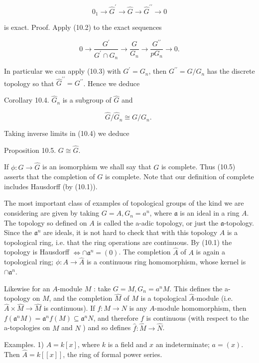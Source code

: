 \documentclass{standalone}
\theoremstyle{definition}
\theoremstyle{remark}
\begin{document}
\[
0_{1} \rightarrow \hat{G}^{\prime} \rightarrow \hat{G} \rightarrow \hat{G}^{\prime \prime} \rightarrow 0
\]

is exact. Proof. Apply (10.2) to the exact sequences

\[
0 \rightarrow \frac{G^{\prime}}{G^{\prime} \cap G_{n}} \rightarrow \frac{G}{G_{n}} \rightarrow \frac{G^{\prime \prime}}{p G_{n}} \rightarrow 0 .
\]

In particular we can apply (10.3) with $G^{\prime}=G_{n}$, then $G^{\prime \prime}=G / G_{n}$ has the discrete topology so that $\hat{G}^{\prime \prime}=G^{\prime \prime}$. Hence we deduce

Corollary 10.4. $\hat{G}_{n}$ is a subgroup of $\hat{G}$ and

\[
\hat{G} / \hat{G}_{n} \cong G / G_{n} \text {. }
\]

Taking inverse limits in (10.4) we deduce

Proposition 10.5. $G \cong \hat{G}$.

If $\phi: G \rightarrow \hat{G}$ is an isomorphism we shall say that $G$ is complete. Thus (10.5) asserts that the completion of $G$ is complete. Note that our definition of complete includes Hausdorff (by (10.1)).

The most important class of examples of topological groups of the kind we are considering are given by taking $G=A, G_{n}=a^{n}$, where $\mathfrak{a}$ is an ideal in a ring $A$. The topology so defined on $A$ is called the a-adic topology, or just the $\mathfrak{a}$-topology. Since the $\mathfrak{a}^{n}$ are ideals, it is not hard to check that with this topology $A$ is a topological ring, i.e. that the ring operations are continuous. By (10.1) the topology is Hausdorff $\Leftrightarrow \cap \mathfrak{a}^{n}=(0)$. The completion $\hat{A}$ of $A$ is again a topological ring; $\phi: A \rightarrow \hat{A}$ is a continuous ring homomorphism, whose kernel is $\cap \mathfrak{a}^{n}$.

Likewise for an $A$-module $M$ : take $G=M, G_{n}=a^{n} M$. This defines the a-topology on $M$, and the completion $\hat{M}$ of $M$ is a topological $\hat{A}$-module (i.e. $\hat{A} \times \hat{M} \rightarrow \hat{M}$ is continuous). If $f: M \rightarrow N$ is any $A$-module homomorphism, then $f\left(\mathfrak{a}^{n} M\right)=\mathfrak{a}^{n} f(M) \subseteq \mathfrak{a}^{n} N$, and therefore $f$ is continuous (with respect to the a-topologies on $M$ and $N$ ) and so defines $\hat{f}: \hat{M} \rightarrow \hat{N}$.

Examples. 1) $A=k[x]$, where $k$ is a field and $x$ an indeterminate; $a=(x)$. Then $\hat{A}=k[[x]]$, the ring of formal power series.
\end{document}
